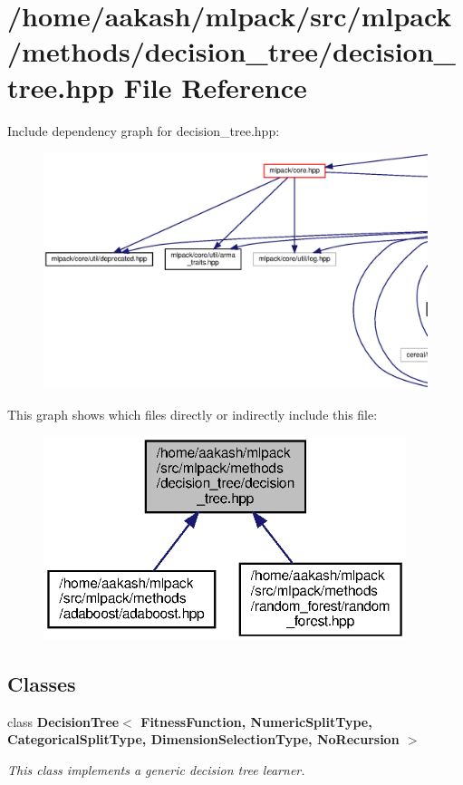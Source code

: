 \section{/home/aakash/mlpack/src/mlpack/methods/decision\+\_\+tree/decision\+\_\+tree.hpp File Reference}
\label{decision__tree_8hpp}
Include dependency graph for decision\+\_\+tree.\+hpp\+:
\nopagebreak
\begin{figure}[H]
\begin{center}
\leavevmode
\includegraphics[width=350pt]{decision__tree_8hpp__incl}
\end{center}
\end{figure}
This graph shows which files directly or indirectly include this file\+:
\nopagebreak
\begin{figure}[H]
\begin{center}
\leavevmode
\includegraphics[width=300pt]{decision__tree_8hpp__dep__incl}
\end{center}
\end{figure}
\subsection*{Classes}
\begin{DoxyCompactItemize}
\item 
class \textbf{ Decision\+Tree$<$ Fitness\+Function, Numeric\+Split\+Type, Categorical\+Split\+Type, Dimension\+Selection\+Type, No\+Recursion $>$}
\begin{DoxyCompactList}\small\item\em This class implements a generic decision tree learner. \end{DoxyCompactList}\end{DoxyCompactItemize}
